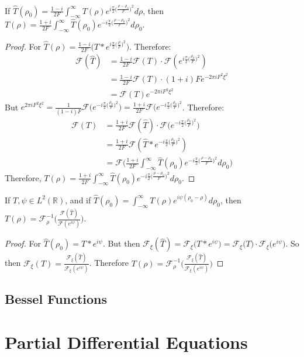 \documentclass[crop=false,class=book,oneside]{standalone}
\begin{document}
            \begin{theorem}
            If $\hat{T}(\rho_0) = \frac{1-i}{2F}\int_{-\infty}^{\infty}T(\rho) e^{i\frac{\pi}{2}\big(\frac{\rho-\rho_0}{F}\big)^2}d\rho$, then $T(\rho) = \frac{1+i}{2F}\int_{-\infty}^{\infty}\hat{T}(\rho_0)e^{-i\frac{\pi}{2}\big(\frac{\rho-\rho_0}{F}\big)^2}d\rho_0$.
            \end{theorem}
            \begin{proof}
            For $\hat{T}(\rho) = \frac{1-i}{2F}(T* e^{i \frac{\pi}{2}\big(\frac{\rho}{F}\big)^2}\big)$. Therefore:
            \begin{align*}
            \mathcal{F}(\hat{T})&=\frac{1-i}{2F}\mathcal{F}(T)\cdot \mathcal{F}(e^{i\frac{\pi}{2}\big(\frac{\rho_0}{F}\big)^2})\\
            &=\frac{1-i}{2F}\mathcal{F}(T)\cdot(1+i)Fe^{-2\pi i F^2 \xi^2}\\
            &=\mathcal{F}(T)e^{-2\pi i F^2 \xi^2}
            \end{align*}
            But $e^{2\pi iF^{2}\xi^{2}}=\frac{1}{(1-i)F}\mathcal{F}\big(e^{-i\frac{\pi}{2}\big(\frac{\rho_0}{F}\big)^2}\big) = \frac{1+i}{2F} \mathcal{F}\big(e^{-i\frac{\pi}{2}\big(\frac{\rho_0}{F}\big)^2}$. Therefore:
            \begin{align*}
            \mathcal{F}(T)&=\frac{1+i}{2F}\mathcal{F}(\hat{T})\cdot\mathcal{F}\big(e^{-i\frac{\pi}{2}\big(\frac{\rho_0}{F}\big)^2}\big)\\
            &=\frac{1+i}{2F}\mathcal{F}(\hat{T}*e^{-i\frac{\pi}{2}\big(\frac{\rho_0}{F}\big)^2})\\
            &=\mathcal{F}\bigg(\frac{1+i}{2F}\int_{-\infty}^{\infty} \hat{T}(\rho_0)e^{-i\frac{\pi}{2}\big(\frac{\rho - \rho_0}{F}\big)^2} d\rho_0\bigg)
            \end{align*}
            Therefore, $T(\rho) = \frac{1+i}{2F}\int_{-\infty}^{\infty}\hat{T}(\rho_0)e^{-i\frac{\pi}{2}\big(\frac{\rho - \rho_0}{F}\big)^2}d\rho_0$.
            \end{proof}
            
            \begin{theorem}
            If $T,\psi \in L^2(\mathbb{R})$, and if $\hat{T}(\rho_0) = \int_{-\infty}^{\infty} T(\rho)e^{i\psi(\rho_0-\rho)}d\rho_0$, then $T(\rho) = \mathcal{F}^{-1}_{\rho}\big(\frac{\mathcal{F}(\hat{T})}{\mathcal{F}(e^{i\psi})}\big)$.
            \end{theorem}
            \begin{proof}
            For $\hat{T}(\rho_0) = T* e^{i\psi}$. But then $\mathcal{F}_{\xi}(\hat{T}) = \mathcal{F}_{\xi}\big(T* e^{i\psi}\big) = \mathcal{F}_{\xi}\big(T\big)\cdot \mathcal{F}_{\xi}\big(e^{i\psi}\big)$. So then $\mathcal{F}_{\xi}(T) = \frac{\mathcal{F}_{\xi}(\hat{T})}{\mathcal{F}_{\xi}(e^{i\psi})}$. Therefore $T(\rho) = \mathcal{F}^{-1}_{\rho}\big(\frac{\mathcal{F}_{\xi}(\hat{T})}{\mathcal{F}_{\xi}(e^{i\psi})}\big)$
            \end{proof}
        \subsection{Bessel Functions}
    \section{Partial Differential Equations}
\end{document}
